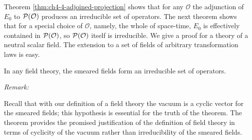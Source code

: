 Theorem \ref{thm:ch4-4-adjoined-projection} shows that for any $\mathcal O$ the adjunction of $E_0$ to
$\mathcal{P}(\mathcal O)$ produces an irreducible set of operators.
The next theorem shows that for a special choice of $\mathcal O$, namely, the
whole of space-time, $E_0$ is effectively contained in
$\mathcal{P}(\mathcal O)$, so $\mathcal{P}(\mathcal O)$ itself
is irreducible. We give a proof for a theory of a neutral scalar field. The
extension to a set of fields of arbitrary transformation laws is easy.

\begin{theorem}[4-5]\label{thm:ch4-5-smeared-fields}
In any field theory, the smeared fields form an irreducible set of operators.
\end{theorem}

\emph{Remark:}

Recall that with our definition of a field theory the vacuum is a cyclic
vector for the smeared fields; this hypothesis is essential for the truth of
the theorem. The theorem provides the promised justification of the
definition of field theory in terms of cyclicity of the vacuum rather than
irreducibility of the smeared fields.

